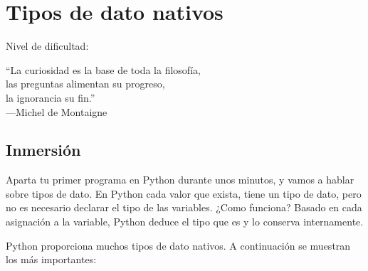 
\chapter{Tipos de dato nativos}\label{ch:tiposdedato}

\noindent
Nivel de dificultad:\difll

\begin{citaCap}
``La curiosidad es la base de toda la filosofía, \\
las preguntas alimentan su progreso, \\
la ignorancia su fin.''\\
---Michel de Montaigne
\end{citaCap}

\section{Inmersión}

Aparta tu primer programa en Python durante unos minutos, y vamos a hablar sobre tipos de dato. En Python cada valor que exista, tiene un tipo de dato, pero no es necesario declarar el tipo de las variables. ¿Como funciona? Basado en cada asignación a la variable, Python deduce el tipo que es y lo conserva internamente.

Python proporciona muchos tipos de dato nativos. A continuación se muestran los más importantes:

